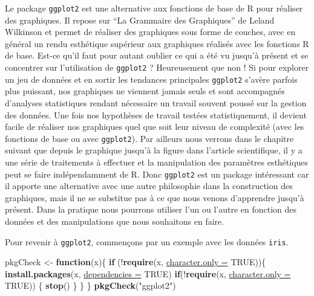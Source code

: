 \documentclass[twoside,symmetric]{book}
\newenvironment{Shaded}{}{}
\newcommand{\ControlFlowTok}[1]{\textbf{#1}}
\newcommand{\DataTypeTok}[1]{\underline{#1}}
\newcommand{\KeywordTok}[1]{\textbf{#1}}
\newcommand{\NormalTok}[1]{#1}
\newcommand{\OperatorTok}[1]{#1}
\newcommand{\OtherTok}[1]{#1}
\newcommand{\StringTok}[1]{#1}
\begin{document}
Le package \texttt{ggplot2} est une alternative aux fonctions de base de R pour réaliser des graphiques. Il repose sur ``La Grammaire des Graphiques'' de Leland Wilkinson et permet de réaliser des graphiques sous forme de couches, avec en général un rendu esthétique supérieur aux graphiques réalisés avec les fonctions R de base. Est-ce qu'il faut pour autant oublier ce qui a été vu jusqu'à présent et se concentrer sur l'utilisation de \texttt{ggplot2} ? Heureusement que non ! Si pour explorer un jeu de données et en sortir les tendances principales \texttt{ggplot2} s'avère parfois plus puissant, nos graphiques ne viennent jamais seuls et sont accompagnés d'analyses statistiques rendant nécessaire un travail souvent poussé sur la gestion des données. Une fois nos hypothèses de travail testées statistiquement, il devient facile de réaliser nos graphiques quel que soit leur niveau de complexité (avec les fonctions de base ou avec \texttt{ggplot2}). Par ailleurs nous verrons dans le chapitre suivant que depuis le graphique jusqu'à la figure dans l'article scientifique, il y a une série de traitements à effectuer et la manipulation des paramètres esthétiques peut se faire indépendamment de R. Donc \texttt{ggplot2} est un package intéressant car il apporte une alternative avec une autre philosophie dans la construction des graphiques, mais il ne se substitue pas à ce que nous venons d'apprendre jusqu'à présent. Dans la pratique nous pourrons utiliser l'un ou l'autre en fonction des données et des manipulations que nous souhaitons en faire.

Pour revenir à \texttt{ggplot2}, commençons par un exemple avec les données \texttt{iris}.

\begin{Shaded}
\begin{Highlighting}[]
\NormalTok{pkgCheck <-}\StringTok{ }\ControlFlowTok{function}\NormalTok{(x)\{ }
    \ControlFlowTok{if}\NormalTok{ (}\OperatorTok{!}\KeywordTok{require}\NormalTok{(x, }\DataTypeTok{character.only =} \OtherTok{TRUE}\NormalTok{))\{}
        \KeywordTok{install.packages}\NormalTok{(x, }\DataTypeTok{dependencies =} \OtherTok{TRUE}\NormalTok{)}
        \ControlFlowTok{if}\NormalTok{(}\OperatorTok{!}\KeywordTok{require}\NormalTok{(x, }\DataTypeTok{character.only =} \OtherTok{TRUE}\NormalTok{)) \{}
            \KeywordTok{stop}\NormalTok{()}
\NormalTok{        \}}
\NormalTok{    \}}
\NormalTok{\}}
\KeywordTok{pkgCheck}\NormalTok{(}\StringTok{"ggplot2"}\NormalTok{)}
\end{Highlighting}
\end{Shaded}
\end{document}
